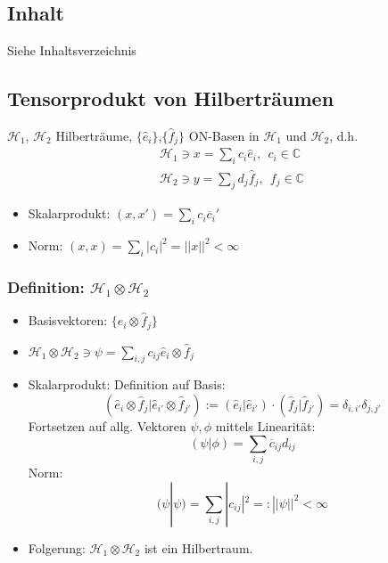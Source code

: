 \documentclass[twoside,a4paper]{scrartcl}
\renewcommand{\1}{\mathds{1}}
\begin{document}
\subsection{Inhalt}
Siehe Inhaltsverzeichnis
\subsection{Tensorprodukt von Hilberträumen}
$\mathcal H_1$, $\mathcal H_2$ Hilberträume, $\{\hat e_i \}$,$\{\hat f_j \}$ ON-Basen in $\mathcal H_1$ und $\mathcal H_2$, d.h.
\begin{align}
 \mathcal H_1 \ni x = \sum_i c_i \hat e_i, \ \ c_i \in \mathbb C \\
 \mathcal H_2 \ni y = \sum_j d_j \hat f_j, \ \ f_j \in \mathbb C 
\end{align}
\begin{itemize}
 \item Skalarprodukt: $(x,x')=\sum_i c_i \overline c_i'$
 \item Norm: $(x,x)=\sum_i |c_i|^2=||x||^2< \infty$
\end{itemize}

\subsubsection*{Definition: $\mathcal H_1 \otimes \mathcal H_2$}
\begin{itemize}
 \item Basisvektoren: $\{ \hat e_i \otimes \hat f_j\}$
 \item $\mathcal H_1 \otimes \mathcal H_2 \ni \psi= \sum_{i,j} c_{ij} \hat e_i \otimes \hat f_j$
 \item Skalarprodukt: 
Definition auf Basis:$$(\hat e_i \otimes \hat f_j |\hat e_{i'} \otimes \hat f_{j'}):= (\hat e_i|\hat e_{i'})\cdot(\hat f_j|\hat f_{j'})=\delta_{i,i'}\delta_{j,j'}$$
Fortsetzen auf allg. Vektoren $\psi, \phi$ mittels Linearität:
$$(\psi|\phi)=\sum_{i,j} \overline c_{ij} d_{ij}$$
Norm:
$$(\psi|\psi)=\sum_{i,j} |c_{ij}|^2=:||\psi||^2<\infty$$
 \item Folgerung:
$\mathcal H_1 \otimes \mathcal H_2$ ist ein Hilbertraum.\\
\end{itemize}
\end{document}
